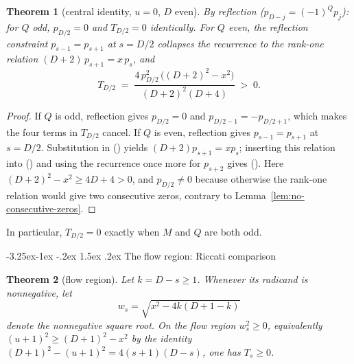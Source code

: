 \documentclass[twoside,10pt]{article}
\makeatletter
\numberwithin{equation}{section}
\theoremstyle{slbody}
\newtheorem{theorem}{Theorem}
\theoremstyle{definition}
\theoremstyle{remark}
\numberwithin{theorem}{section}
\renewcommand{\eqref}[1]{%
  \textup{{\normalfont(\oldstylenums{\ref{#1}}}\normalfont)}}
\renewcommand{\subsection}{%
  \@startsection{subsection}{2}{\z@}%
    {-3.25ex\@plus -1ex \@minus -.2ex}%
    {1.5ex \@plus .2ex}%
    {\normalfont\normalsize\bfseries}}
\makeatother
\begin{document}
\begin{theorem}[central identity, $u=0$, $D$ even]\label{thm:center}
By reflection ($p_{D-j}=(-1)^Qp_j$): for $Q$ odd, $p_{D/2}=0$ and
$T_{D/2}=0$ identically.  For $Q$ even, the reflection constraint
$p_{s-1}=p_{s+1}$ at $s=D/2$ collapses the recurrence to the rank-one
relation $(D+2)\,p_{s+1}=x\,p_s$, and
\begin{equation}\label{eq:center}
  T_{D/2} \;=\; \frac{4\,p_{D/2}^2\,\bigl((D+2)^2-x^2\bigr)}
                     {(D+2)^2(D+4)} \;>\; 0.
\end{equation}
\end{theorem}

\begin{proof}
If $Q$ is odd, reflection gives $p_{D/2}=0$ and
$p_{D/2-1}=-p_{D/2+1}$, which makes the four terms in $T_{D/2}$ cancel.
If $Q$ is even, reflection gives $p_{s-1}=p_{s+1}$ at $s=D/2$.
Substitution in \eqref{eq:recurrence} yields
$(D+2)p_{s+1}=xp_s$; inserting this relation into \eqref{eq:Tdef} and using
the recurrence once more for $p_{s+2}$ gives \eqref{eq:center}.  Here
$(D+2)^2-x^2\ge 4D+4>0$, and $p_{D/2}\ne0$ because otherwise the rank-one
relation would give two consecutive zeros, contrary to
Lemma~\ref{lem:no-consecutive-zeros}.
\end{proof}

In particular, $T_{D/2}=0$ exactly when $M$ and $Q$ are both odd.

\subsection{The flow region: Riccati comparison}

\begin{theorem}[flow region]\label{thm:flow}
Let $k=D-s\ge 1$.  Whenever its radicand is nonnegative, let
\[
 w_s=\sqrt{x^2-4k(D+1-k)}
\]
denote the nonnegative square root.  On the flow region $w_s^2\ge 0$,
equivalently
$(u+1)^2\ge(D+1)^2-x^2$ by the identity
$(D+1)^2-(u+1)^2=4(s+1)(D-s)$, one has $T_s\ge 0$.
\end{theorem}
\end{document}
